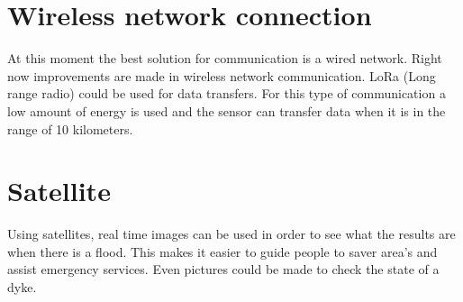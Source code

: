 \section{Wireless network connection} 
At this moment the best solution for communication is a wired network. Right now improvements are made in wireless network communication. LoRa (Long range radio) could be used for data transfers. For this type of communication a low amount of energy is used and the sensor can transfer data when it is in the range of 10 kilometers.

\section{Satellite}
Using satellites, real time images can be used in order to see what the results are when there is a flood. This makes it easier to guide people to saver area's and assist emergency services. Even pictures could be made to check the state of a dyke.





